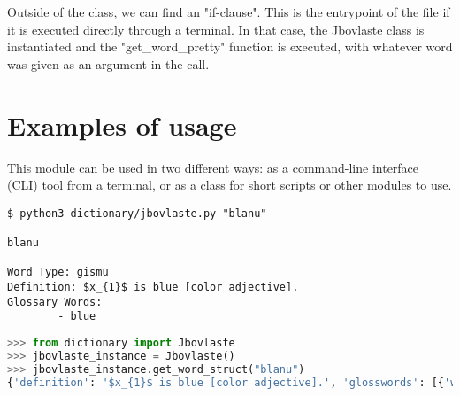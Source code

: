 Outside of the class, we can find an "if-clause".
This is the entrypoint of the file if it is executed directly through a terminal.
In that case, the Jbovlaste class is instantiated and the "get\_word\_pretty" function
is executed, with whatever word was given as an argument in the call.

\newpage

\section{Examples of usage}

This module can be used in two different ways: as a command-line interface (CLI) tool
from a terminal, or as a class for short scripts or other modules to use.

\begin{lstlisting}[caption=Jbovlaste module being used as a command-line interface tool]
$ python3 dictionary/jbovlaste.py "blanu"

blanu

Word Type: gismu
Definition: $x_{1}$ is blue [color adjective].
Glossary Words:
        - blue
\end{lstlisting}

\begin{lstlisting}[language=Python, caption=Jbovlaste class being used by a Python script]
>>> from dictionary import Jbovlaste
>>> jbovlaste_instance = Jbovlaste()
>>> jbovlaste_instance.get_word_struct("blanu")
{'definition': '$x_{1}$ is blue [color adjective].', 'glosswords': [{'word': 'blue', 'sense': None}], 'type': 'gismu'}
\end{lstlisting}